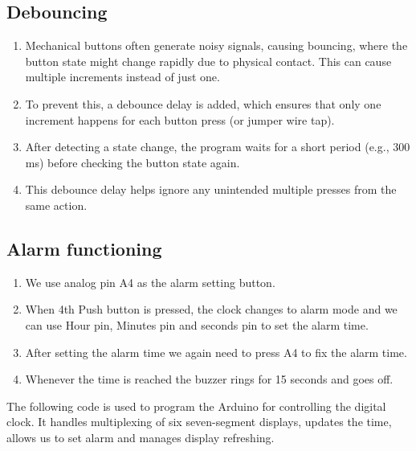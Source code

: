 \documentclass[journal]{IEEEtran}
\begin{document}
\subsection{Debouncing}
\begin{enumerate}
    \item Mechanical buttons often generate noisy signals, causing bouncing, where the button state might change rapidly due to physical contact. This can cause multiple increments instead of just one.
    \item To prevent this, a debounce delay is added, which ensures that only one increment happens for each button press (or jumper wire tap).
    \item After detecting a state change, the program waits for a short period (e.g., 300 ms) before checking the button state again.
    \item This debounce delay helps ignore any unintended multiple presses from the same action.
\end{enumerate}

\subsection{Alarm functioning}
\begin{enumerate}
    \item We use analog pin A4 as the alarm setting button.
    \item When 4th Push button is pressed, the clock changes to alarm mode and we can use Hour pin, Minutes pin and seconds pin to set the alarm time.
    \item After setting the alarm time we again need to press A4 to fix the alarm time.
    \item Whenever the time is reached the buzzer rings for 15 seconds and goes off.
\end{enumerate}
\newpage
The following code is used to program the Arduino for controlling the digital clock. It handles multiplexing of six seven-segment displays, updates the time, allows us to set alarm and manages display refreshing.\\
\end{document}
